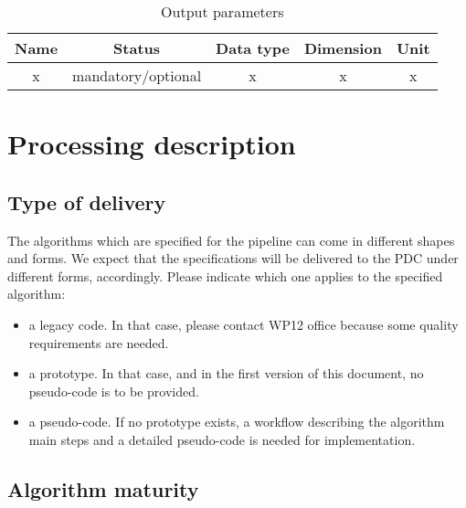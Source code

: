 \documentclass[a4paper, oneside, 11pt, article, english]{memoir}
\begin{document}
\begin{table}[htbp]
  \centering
  \caption{Output parameters}
  \label{tab:output}
  \begin{tabular}{ccccc}
    \toprule
    Name & Status & Data type & Dimension & Unit \\
    \midrule
    x & mandatory/optional & x & x & x \\
    \bottomrule
  \end{tabular}
\end{table}


\clearpage
\chapter{Processing description}
\label{chap:processing}

\section{Type of delivery}
\label{sec:delivery}

{
  \itshape

  The algorithms which are specified for the pipeline can come in different
  shapes and forms. We expect that the specifications will be delivered to the
  PDC under different forms, accordingly. Please indicate which one applies to
  the specified algorithm:

  \begin{itemize}
    \firmlist
  \item a legacy code. In that case, please contact WP12 office because some
    quality requirements are needed.
  \item a prototype. In that case, and in the first version of this document, no
    pseudo-code is to be provided.
  \item a pseudo-code. If no prototype exists, a workflow describing the
    algorithm main steps and a detailed pseudo-code is needed for
    implementation.
  \end{itemize}
}


\section{Algorithm maturity}
\label{sec:mature}
\end{document}
